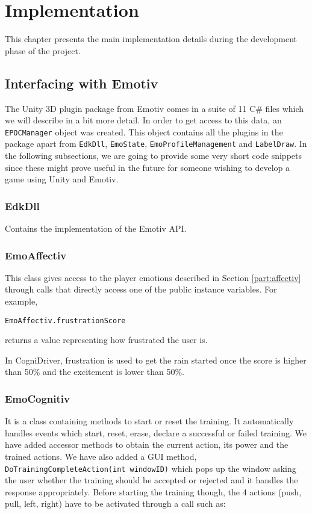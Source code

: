 \pagestyle{fancy}

\chapter{Implementation}
\label{cha:implementation}

This chapter presents the main implementation details during the development phase of the project.

\section{Interfacing with Emotiv}
The Unity 3D plugin package from Emotiv comes in a suite of 11 C\# files which we will describe in a bit more detail. In order to get access to this data, an  \texttt{EPOCManager} object was created. This object contains all the plugins in the package apart from  \texttt{EdkDll}, \texttt{EmoState}, \texttt{EmoProfileManagement} and \texttt{LabelDraw}. In the following subsections, we are going to provide some very short code snippets since these might prove useful in the future for someone wishing to develop a game using Unity and Emotiv.

\subsection{EdkDll}
Contains the implementation of the Emotiv API.

\subsection{EmoAffectiv} 
This class gives access to the player emotions described in Section \ref{part:affectiv} through calls that directly access one of the public instance variables. For example,

\begin{Verbatim}[frame=single, framesep=3mm]
EmoAffectiv.frustrationScore
\end{Verbatim}

returns a value representing how frustrated the user is.

In CogniDriver, frustration is used to get the rain started once the score is higher than 50\% and the excitement is lower than 50\%. 

\subsection{EmoCognitiv} 
It is a class containing methods to start or reset the training. It automatically handles events which start, reset, erase, declare a successful or failed training. We have added accessor methods to obtain the current action, its power and the trained actions. We have also added a GUI method, \texttt{DoTrainingCompleteAction(int windowID)} which pops up the window asking the user whether the training should be accepted or rejected and it handles the response appropriately. Before starting the training though, the 4 actions (push, pull, left, right) have to be activated through a call such as: 

